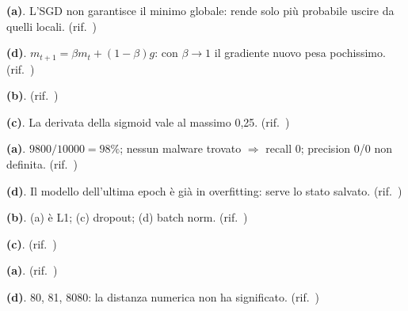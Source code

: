 \begin{soluzione}
\textbf{(a)}. L'SGD non garantisce il minimo globale: rende solo più probabile uscire da quelli locali. (rif.\ )
\end{soluzione}

\begin{soluzione}
\textbf{(d)}. $m_{t+1} = \beta m_t + (1-\beta)g$: con $\beta\to1$ il gradiente nuovo pesa pochissimo. (rif.\ )
\end{soluzione}

\begin{soluzione}
\textbf{(b)}. (rif.\ )
\end{soluzione}

\begin{soluzione}
\textbf{(c)}. La derivata della sigmoid vale al massimo 0,25. (rif.\ )
\end{soluzione}

\begin{soluzione}
\textbf{(a)}. $9800/10000 = 98\%$; nessun malware trovato $\Rightarrow$ recall 0; precision 0/0 non definita. (rif.\ )
\end{soluzione}

\begin{soluzione}
\textbf{(d)}. Il modello dell'ultima epoch è già in overfitting: serve lo stato salvato. (rif.\ )
\end{soluzione}

\begin{soluzione}
\textbf{(b)}. (a) è L1; (c) dropout; (d) batch norm. (rif.\ )
\end{soluzione}

\begin{soluzione}
\textbf{(c)}. (rif.\ )
\end{soluzione}

\begin{soluzione}
\textbf{(a)}. (rif.\ )
\end{soluzione}

\begin{soluzione}
\textbf{(d)}. 80, 81, 8080: la distanza numerica non ha significato. (rif.\ )
\end{soluzione}

